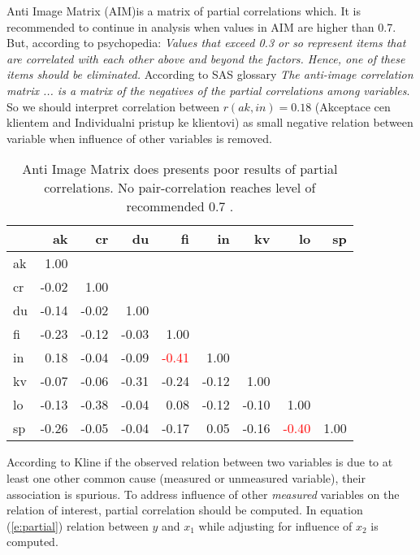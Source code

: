 \documentclass[10pt,a4paper]{article}
\begin{document}
Anti Image Matrix (AIM)is a matrix of partial correlations which. It is recommended to continue in analysis when values in AIM are higher than 0.7. But, according to psychopedia: \emph{Values that exceed 0.3 or so represent items that are correlated with each other above and beyond the factors. Hence, one of these items should be eliminated.}\cite{psychopedia} According to SAS glossary \emph{The anti-image correlation matrix ... is a matrix of the negatives of the partial correlations among variables}.\cite{sas_glossary} So we should interpret correlation between $r(ak, in)= 0.18$ (Akceptace cen klientem and Individualni pristup ke klientovi) as small negative relation between variable when influence of other variables is removed.
\begin{table}[ht]
\centering
\caption{Anti Image Matrix does presents poor results of partial correlations. No pair-correlation reaches level of recommended 0.7 .}  

\begin{tabular}{lrrrrrrrr}
  \hline
 & ak & cr & du & fi & in & kv & lo & sp \\ 
  \hline
ak & 1.00 &  &  &  &  &  &  &  \\ 
  cr & -0.02 & 1.00 &  &  &  &  & &  \\ 
  du & -0.14 & -0.02 & 1.00 &  &  &  &  &  \\ 
  fi & -0.23 & -0.12 & -0.03 & 1.00 &  &  &  &  \\ 
  in & \textcolor{NavyBlue}{0.18} & -0.04 & -0.09 & \textcolor{Red}{-0.41} & 1.00 &  &  &  \\ 
  kv & -0.07 & -0.06 & -0.31 & -0.24 & -0.12 & 1.00 &  &  \\ 
  lo & -0.13 & -0.38 & -0.04 & \textcolor{NavyBlue}{0.08} & -0.12 & -0.10 & 1.00 &  \\ 
  sp & -0.26 & -0.05 & -0.04 & -0.17 & \textcolor{NavyBlue}{0.05} & -0.16 & \textcolor{Red}{-0.40} & 1.00 \\ 
   \hline
\end{tabular}
\end{table}

According to Kline if the observed relation between two variables is due to at least one other common cause (measured or unmeasured variable), their association is spurious. To address influence of other \emph{measured} variables on the relation of interest, partial correlation should be  computed. In equation (\ref{e:partial}) relation between $y$ and $x_1$ while adjusting for influence of $x_2$ is computed. 
\end{document}
